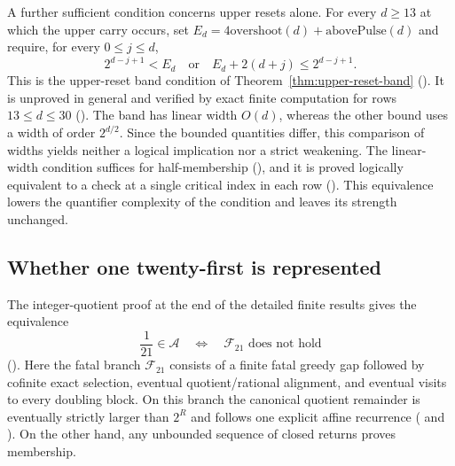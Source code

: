 A further sufficient condition concerns upper resets alone.  For
every $d\ge13$ at which the upper carry occurs, set
$E_d=4\mathrm{overshoot}(d)+\mathrm{abovePulse}(d)$ and require,
for every $0\le j\le d$,
\[
 2^{d-j+1}<E_d\quad\text{or}\quad
 E_d+2(d+j)\le2^{d-j+1}.
\]
This is the upper-reset band condition of Theorem~\ref{thm:upper-reset-band}
().  It is
unproved in general and verified by exact finite computation for rows $13\le d\le30$
().
The band has linear width $O(d)$, whereas the other bound uses a width
of order $2^{d/2}$.  Since the bounded quantities differ, this
comparison of widths yields neither a logical implication nor a strict
weakening.  The linear-width condition suffices for half-membership
(),
and it is proved logically equivalent to a check at a single critical index in each row
().
This equivalence lowers the quantifier complexity of the condition and leaves its strength unchanged.

\subsection{Whether one twenty-first is represented}

The integer-quotient proof at
{the end of the detailed finite results} gives the equivalence
\[
 \frac1{21}\in\mathcal A
 \quad\Longleftrightarrow\quad
 \text{$\mathcal F_{21}$ does not hold}
\]
().
Here the fatal branch $\mathcal F_{21}$ consists of a finite fatal greedy gap followed
by cofinite exact selection, eventual quotient/rational alignment, and
eventual visits to every doubling block.  On this branch the canonical
quotient remainder is eventually strictly larger than $2^R$ and follows one
explicit affine recurrence
(
and
).
On the other hand, any unbounded sequence of closed returns proves membership.

